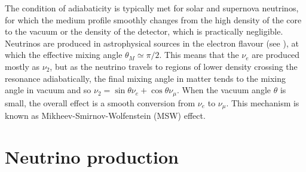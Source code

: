 The condition of adiabaticity is typically met for solar and supernova neutrinos, %
for which the medium profile smoothly changes from the high density of the core %
to the vacuum or the density of the detector, which is practically negligible.
Neutrinos are produced in astrophysical sources in the electron flavour (see ), %
at which the effective mixing angle $\theta_M \simeq \pi/2$.
This means that the $\nu_e$ are produced mostly as $\nu_2$, but as the neutrino travels to %
regions of lower density crossing the resonance adiabatically, %
the final mixing angle in matter tends to the mixing angle in vacuum and %
so $\nu_2 = \sin\theta \nu_e + \cos\theta \nu_\mu$.
When the vacuum angle $\theta$ is small, the overall effect is a smooth conversion from $\nu_e$ to $\nu_\mu$.
This mechanism is known as Mikheev-Smirnov-Wolfenstein (MSW) effect.

\section{Neutrino production}
\label{sec:nu_prod}

